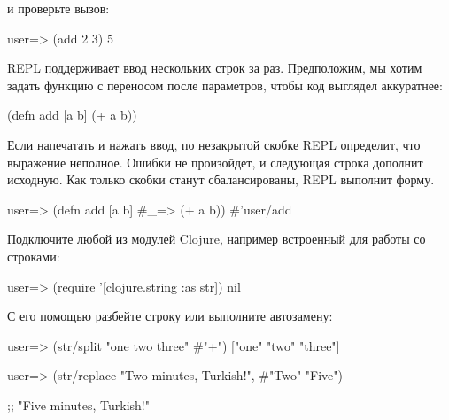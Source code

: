 \noindent
и проверьте вызов:

\begin{english}
  \begin{clojure}
user=> (add 2 3)
5
  \end{clojure}
\end{english}

REPL поддерживает ввод нескольких строк за раз. Предположим, мы хотим задать функцию с переносом после параметров, чтобы код выглядел аккуратнее:

\begin{english}
  \begin{clojure}
(defn add [a b]
  (+ a b))
  \end{clojure}
\end{english}

Если напечатать  и нажать ввод, по незакрытой скобке REPL определит, что выражение неполное. Ошибки не произойдет, и следующая строка дополнит исходную. Как только скобки станут сбалансированы, REPL выполнит форму.

\begin{english}
  \begin{clojure}
user=> (defn add [a b]
  #_=> (+ a b))
#'user/add
  \end{clojure}
\end{english}

Подключите любой из модулей Clojure, например встроенный  для работы со строками:

\begin{english}
  \begin{clojure}
user=> (require '[clojure.string :as str])
nil
  \end{clojure}
\end{english}

С его помощью разбейте строку или выполните автозамену:

\begin{english}
  \begin{clojure}
user=> (str/split "one two three" #"\s+")
["one" "two" "three"]
  \end{clojure}
\end{english}

\begin{english}
  \begin{clojure}
user=> (str/replace
          "Two minutes, Turkish!",
           #"Two" "Five")

;; "Five minutes, Turkish!"
  \end{clojure}
\end{english}

